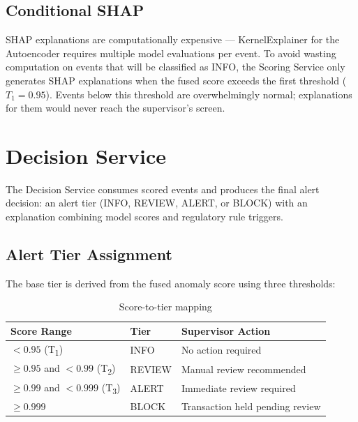 \subsection{Conditional SHAP}

SHAP explanations are computationally expensive --- KernelExplainer for the
Autoencoder requires multiple model evaluations per event. To avoid wasting
computation on events that will be classified as INFO, the Scoring Service
only generates SHAP explanations when the fused score exceeds the first
threshold ($T_1 = 0.95$). Events below this threshold are overwhelmingly
normal; explanations for them would never reach the supervisor's screen.

\section{Decision Service}

The Decision Service consumes scored events and produces the final alert
decision: an alert tier (INFO, REVIEW, ALERT, or BLOCK) with an explanation
combining model scores and regulatory rule triggers.

\subsection{Alert Tier Assignment}

The base tier is derived from the fused anomaly score using three thresholds:

\begin{table}[H]
\centering
\caption{Score-to-tier mapping}
\label{tab:tier-thresholds}
\begin{tabular}{@{}lll@{}}
\toprule
\textbf{Score Range} & \textbf{Tier} & \textbf{Supervisor Action} \\
\midrule
$< 0.95$ (T\textsubscript{1})                          & INFO   & No action required \\
$\geq 0.95$ and $< 0.99$ (T\textsubscript{2})          & REVIEW & Manual review recommended \\
$\geq 0.99$ and $< 0.999$ (T\textsubscript{3})         & ALERT  & Immediate review required \\
$\geq 0.999$                                            & BLOCK  & Transaction held pending review \\
\bottomrule
\end{tabular}
\end{table}


